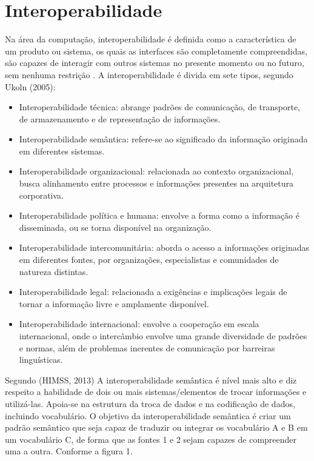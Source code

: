 \section{Interoperabilidade}
	Na área da computação, interoperabilidade é definida como a característica de um produto ou sistema, os quais as interfaces são completamente compreendidas, são capazes de interagir com outros sistemas no presente momento ou no futuro, sem nenhuma restrição \cite{CHAPURLAT20121523}.
	A interoperabilidade é divida em sete tipos, segundo  Ukoln (2005):
    \begin{itemize}
        	\item Interoperabilidade técnica: abrange padrões de comunicação, de transporte,
de armazenamento e de representação de informações.
            \item Interoperabilidade semântica: refere-se ao significado da informação originada
em diferentes sistemas. 
            \item Interoperabilidade organizacional: relacionada ao contexto organizacional,
busca alinhamento entre processos e informações presentes na arquitetura
corporativa. 
            \item Interoperabilidade política e humana: envolve a forma como a informação é
disseminada, ou se torna disponível na organização.
            \item Interoperabilidade intercomunitária: aborda o acesso a informações originadas
em diferentes fontes, por organizações, especialistas e comunidades de
natureza distintas. 
\item Interoperabilidade legal: relacionada a exigências e implicações legais de
tornar a informação livre e amplamente disponível. 
\item  Interoperabilidade internacional: envolve a cooperação em escala
internacional, onde o intercâmbio envolve uma grande diversidade de padrões
e normas, além de problemas inerentes de comunicação por barreiras
linguísticas. 

        \end{itemize}
    Segundo (HIMSS, 2013) \cite{HIMSS} A interoperabilidade semântica é nível mais alto e diz respeito a habilidade de dois ou mais sistemas/elementos de trocar informações e utilizá-las. Apoia-se na estrutura da troca de dados e na codificação de dados, incluindo vocabulário.
    O objetivo da interoperabilidade semântica é criar um padrão semântico que seja capaz de traduzir ou integrar os vocabulário A e B em um vocabulário C, de forma que as fontes 1 e 2 sejam capazes de compreender uma a outra\cite{INTEROPENEHR}. Conforme a figura 1.    
        
